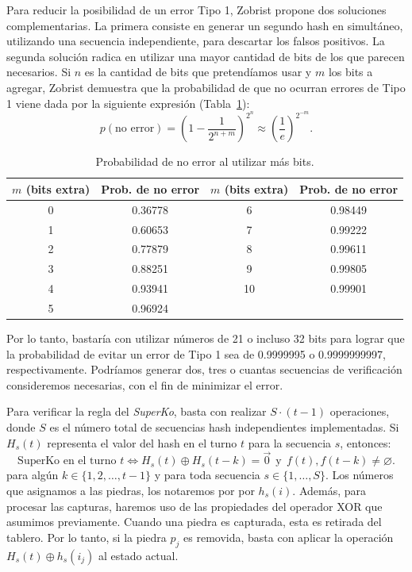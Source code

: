 Para reducir la posibilidad de un error Tipo 1, Zobrist propone dos soluciones complementarias. La primera consiste en generar un segundo hash en simultáneo, utilizando una secuencia independiente, para descartar los falsos positivos. La segunda solución radica en utilizar una mayor cantidad de bits de los que parecen necesarios. Si $n$ es la cantidad de bits que pretendíamos usar y $m$ los bits a agregar, Zobrist demuestra que la probabilidad de que no ocurran errores de Tipo 1 viene dada por la siguiente expresión (Tabla~\ref{Tabla_prob}):
$$p(\text{no error}) = \left( 1 - \frac{1}{2^{n+m}} \right)^{2^n} \approx \left( \frac{1}{e} \right)^{2^{-m}}.$$
\begin{table}[H]
	\centering
	\begin{tabular}{c|c || c|c}
		\textbf{$m$ (bits extra)} & \textbf{Prob. de no error} & \textbf{$m$ (bits extra)} & \textbf{Prob. de no error} \\ \hline
		0 & 0.36778 & 6  & 0.98449 \\
		1 & 0.60653 & 7  & 0.99222 \\
		2 & 0.77879 & 8  & 0.99611 \\
		3 & 0.88251 & 9  & 0.99805 \\
		4 & 0.93941 & 10 & 0.99901 \\
		5 & 0.96924 & \multicolumn{2}{c}{}
	\end{tabular}
	\caption{Probabilidad de no error al utilizar más bits.}
	\label{Tabla_prob}
\end{table}
Por lo tanto, bastaría con utilizar números de 21 o incluso 32 bits para lograr que la probabilidad de evitar un error de Tipo 1 sea de 0.9999995 o 0.9999999997, respectivamente. Podríamos generar dos, tres o cuantas secuencias de verificación consideremos necesarias, con el fin de minimizar el error.

Para verificar la regla del \textit{SuperKo}, basta con realizar $S \cdot (t-1)$ operaciones, donde $S$ es el número total de secuencias hash independientes implementadas. Si $H_{s}(t)$ representa el valor del hash en el turno $t$ para la secuencia $s$, entonces:
$$ \text{SuperKo en el turno } t \iff H_{s}(t) \oplus H_{s}(t-k) = \vec{0}\ \ \text{y}\ \  f(t),f(t-k)\neq \varnothing.$$
para algún $k \in \{1, 2, \dots, t-1\}$ y para toda secuencia $s \in \{1, \dots, S\}$. Los números que asignamos a las piedras, los notaremos por por $h_s(i)$. Además, para procesar las capturas, haremos uso de las propiedades del operador XOR que asumimos previamente. Cuando una piedra es capturada, esta es retirada del tablero. Por lo tanto, si la piedra $p_{j}$ es removida, basta con aplicar la operación $H_s(t) \oplus h_s(i_{j})$ al estado actual.

